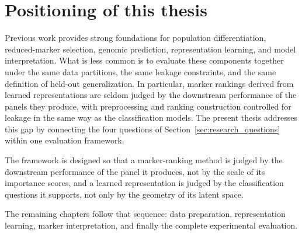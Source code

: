 \section{Positioning of this thesis}
\label{sec:research_gap}

Previous work provides strong foundations for population
differentiation, reduced-marker selection, genomic prediction,
representation learning, and model interpretation. What is less
common is to evaluate these components together under the same data
partitions, the same leakage constraints, and the same definition of
held-out generalization. In particular, marker rankings derived from
learned representations are seldom judged by the downstream performance
of the panels they produce, with preprocessing and ranking construction
controlled for leakage in the same way as the classification models.
The present thesis addresses this gap by connecting the four questions
of Section~\ref{sec:research_questions} within one evaluation
framework.

The framework is designed so that a marker-ranking method is judged
by the downstream performance of the panel it produces, not by the
scale of its importance scores, and a learned representation is judged
by the classification questions it supports, not only by the geometry
of its latent space.

The remaining chapters follow that sequence: data preparation,
representation learning, marker interpretation, and finally the
complete experimental evaluation.
